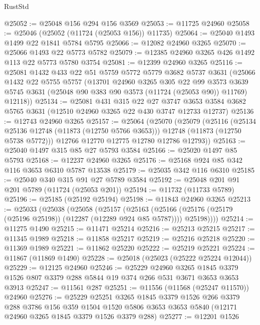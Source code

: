 \begin{lexlean}{RustStd}
\begin{coremodule}
@25052 := @25048 @156 @294 @156 @3569
@25053 := @11725 @24960
@25058 := @25046 (@25052 (@11724 (@25053 @156)) @11735)
@25064 := @25040 @1493 @1499 @22 @1841 @5784 @5795
@25066 := @12082 @24960 @3265
@25070 := @25066 @1493 @22 @5773 @5782
@25079 := @12385 @24960 @3265 @426 @1492 @113 @22 @5773 @5780 @3754
@25081 := @12399 @24960 @3265
@25116 := @25081
    @1432
    @433
    @22
    @51
    @5759
    @5772
    @5779
    @3682
    @5737
    @3631
    (@25066
      @1432
      @22
      @5755
      @5757
      (@13701
        @24960
        @3265
        @305
        @22
        @99
        @3573
        @3639
        @5745
        @3631
        (@25048 @90 @383 @90 @3573 (@11724 (@25053 @90)) @11769)
        @12118))
@25134 := @25081
    @431
    @315
    @22
    @27
    @3747
    @3653
    @3584
    @3682
    @5765
    @3631
    (@12510 @24960 @3265 @22 @430 @3747 @12733 @12737)
@25136 := @12743 @24960 @3265
@25157 := @25064
    (@25070
      (@25079
        (@25116
          (@25134 @25136 @12748 (@11873 (@12750 @5766 @3653)))
          @12748
          (@11873 (@12750 @5738 @5772)))
        @12766
        @12770
        @12775
        @12780
        @12786
        @12793))
@25163 := @25040 @1497 @315 @85 @27 @5793 @3584
@25166 := @25020 @1497 @85 @5793
@25168 := @12237 @24960 @3265
@25176 := @25168 @924 @85 @342 @116 @3653 @6310 @5787 @13538
@25179 := @25035 @342 @116 @6310
@25185 := @25040 @340 @315 @91 @27 @5789 @3584
@25192 := @25048 @201 @91 @201 @5789 (@11724 (@25053 @201))
@25194 := @11732 (@11733 @5789)
@25196 := @25185 (@25192 @25194)
@25198 := @11843 @24960 @3265
@25213 := @25033
    (@25038
      (@25058
        (@25157
          (@25163
            (@25166 (@25176 (@25179 (@25196 @25198)) (@12287 (@12289 @924 @85 @5787))))
            @25198))))
@25214 := @11275 @1490
@25215 := @11471 @25214
@25216 := @25213 @25215
@25217 := @11345 @1989
@25218 := @11858 @25217
@25219 := @25216 @25218
@25220 := @11369 @1989
@25221 := @11862 @25220
@25222 := @25219 @25221
@25224 := @11867 (@11869 @1490)
@25228 := @25018 (@25023 (@25222 @25224 @12044))
@25229 := @12125 @24960
@25246 := @25229
    @24960
    @3265
    @1845
    @3379
    @1526
    @807
    @3379
    @288
    @5844
    @19
    @374
    @266
    @531
    @3671
    @3653
    @3653
    @3913
@25247 := @11561 @287
@25251 := @11556 (@11568 (@25247 @11570)) @24960
@25276 := @25229
    @25251
    @3265
    @1845
    @3379
    @1526
    @266
    @3379
    @288
    @3786
    @156
    @359
    @1504
    @1520
    @5806
    @3653
    @3653
    @5840
    (@12171 @24960 @3265 @1845 @3379 @1526 @3379 @288)
@25277 := @12201 @1526

\end{coremodule}
\end{lexlean}

